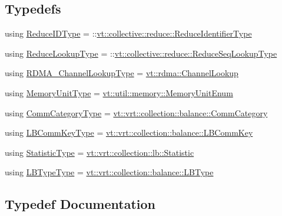 \subsection*{Typedefs}
\begin{DoxyCompactItemize}
\item 
using \hyperlink{namespacestd_a499b9bfc09049e7ac355a623c6e3c357}{Reduce\+I\+D\+Type} = \+::\hyperlink{namespacevt_1_1collective_1_1reduce_ad688d164ad18b2011198cbc97cc84b74}{vt\+::collective\+::reduce\+::\+Reduce\+Identifier\+Type}
\item 
using \hyperlink{namespacestd_ac07dcbf55c02624fc69badeb378edb40}{Reduce\+Lookup\+Type} = \+::\hyperlink{namespacevt_1_1collective_1_1reduce_a3e69dddbbc89a0c9e9b986c5642efeba}{vt\+::collective\+::reduce\+::\+Reduce\+Seq\+Lookup\+Type}
\item 
using \hyperlink{namespacestd_a30c426bd959ae4c3814e36d01efe9df7}{R\+D\+M\+A\+\_\+\+Channel\+Lookup\+Type} = \hyperlink{structvt_1_1rdma_1_1_channel_lookup}{vt\+::rdma\+::\+Channel\+Lookup}
\item 
using \hyperlink{namespacestd_ad7105ed4fa94bea7fce7b09cea2c7165}{Memory\+Unit\+Type} = \hyperlink{namespacevt_1_1util_1_1memory_a64df3d84293b34009f78e2a1db2f9bb6}{vt\+::util\+::memory\+::\+Memory\+Unit\+Enum}
\item 
using \hyperlink{namespacestd_a4dd27d43e4725feae37124932561af56}{Comm\+Category\+Type} = \hyperlink{namespacevt_1_1vrt_1_1collection_1_1balance_a9cc6c6884ca0416dae824e9204093c57}{vt\+::vrt\+::collection\+::balance\+::\+Comm\+Category}
\item 
using \hyperlink{namespacestd_a3a6802ab62d3595b44a8463f8e654c31}{L\+B\+Comm\+Key\+Type} = \hyperlink{structvt_1_1vrt_1_1collection_1_1balance_1_1_l_b_comm_key}{vt\+::vrt\+::collection\+::balance\+::\+L\+B\+Comm\+Key}
\item 
using \hyperlink{namespacestd_a77b0310083adc8639f9659f5c8b3cf0d}{Statistic\+Type} = \hyperlink{namespacevt_1_1vrt_1_1collection_1_1lb_af0e20ef9afee77295053aa83bf1348b1}{vt\+::vrt\+::collection\+::lb\+::\+Statistic}
\item 
using \hyperlink{namespacestd_ae3c14c256fabd8bbed83c439b367c3d8}{L\+B\+Type\+Type} = \hyperlink{namespacevt_1_1vrt_1_1collection_1_1balance_ac4f99693509affcc67db182d4aad9b5c}{vt\+::vrt\+::collection\+::balance\+::\+L\+B\+Type}
\end{DoxyCompactItemize}


\subsection{Typedef Documentation}
\mbox{\label{namespacestd_a4dd27d43e4725feae37124932561af56}} 
